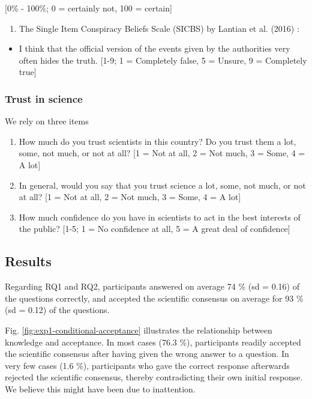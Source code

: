 \documentclass[
  doc,floatsintext]{apa6}
\providecommand{\tightlist}{%
  \setlength{\itemsep}{0pt}\setlength{\parskip}{0pt}}
\begin{document}
{[}0\% - 100\%; 0 = certainly not, 100 = certain{]}

\begin{enumerate}
\def\labelenumi{\arabic{enumi}.}
\setcounter{enumi}{1}
\tightlist
\item
  The Single Item Conspiracy Beliefs Scale (SICBS) by Lantian et al. (2016) :
\end{enumerate}

\begin{itemize}
\tightlist
\item
  I think that the official version of the events given by the authorities very often hides the truth. {[}1-9; 1 = Completely false, 5 = Unsure, 9 = Completely true{]}
\end{itemize}

\subsubsection{Trust in science}\label{trust-in-science-2}

We rely on three items

\begin{enumerate}
\def\labelenumi{\arabic{enumi}.}
\item
  How much do you trust scientists in this country? Do you trust them a lot, some, not much, or not at all? {[}1 = Not at all, 2 = Not much, 3 = Some, 4 = A lot{]}
\item
  In general, would you say that you trust science a lot, some, not much, or not at all? {[}1 = Not at all, 2 = Not much, 3 = Some, 4 = A lot{]}
\item
  How much confidence do you have in scientists to act in the best interests of the public? {[}1-5; 1 = No confidence at all, 5 = A great deal of confidence{]}
\end{enumerate}

\subsection{Results}\label{results-1}

Regarding RQ1 and RQ2, participants answered on average 74 \% (sd = 0.16) of the questions correctly, and accepted the scientific consensus on average for 93 \% (sd = 0.12) of the questions.

Fig. \ref{fig:exp1-conditional-acceptance} illustrates the relationship between knowledge and acceptance. In most cases (76.3 \%), participants readily accepted the scientific consensus after having given the wrong answer to a question. In very few cases (1.6 \%), participants who gave the correct response afterwards rejected the scientific consensus, thereby contradicting their own initial response. We believe this might have been due to inattention.
\end{document}
